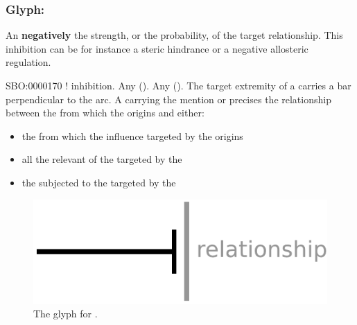 
\subsubsection{Glyph: }\label{sec:inhibition}

An  \textbf{negatively}  the strength, or the probability, of the target relationship. This inhibition can be for instance a steric hindrance or a negative allosteric regulation.

\begin{glyphDescription}
 \glyphSboTerm SBO:0000170 ! inhibition.
 \glyphOrigin Any  ().
 \glyphTarget Any  ().
 \glyphEndPoint The target extremity of a  carries a bar perpendicular to the arc.
 \glyphAux A  carrying the mention  or  precises the relationship between the  from which the  origins and either:
\begin{itemize}
\item the  from which the influence targeted by the  origins
\item all the relevant  of the  targeted by the 
\item the  subjected to the  targeted by the 
\end{itemize}
 \end{glyphDescription}

\begin{figure}[H]
  \centering
  \includegraphics[scale = 0.5]{images/inhibition}
  \caption{The \ER glyph for .}
  \label{fig:inhibition}
\end{figure}

